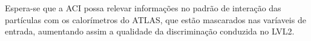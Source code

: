 Espera-se que a ACI possa relevar informações no padrão de interação das
partículas com os calorímetros do ATLAS, que estão mascarados nas varíaveis de
entrada, aumentando assim a qualidade da discriminação conduzida no LVL2.

%



